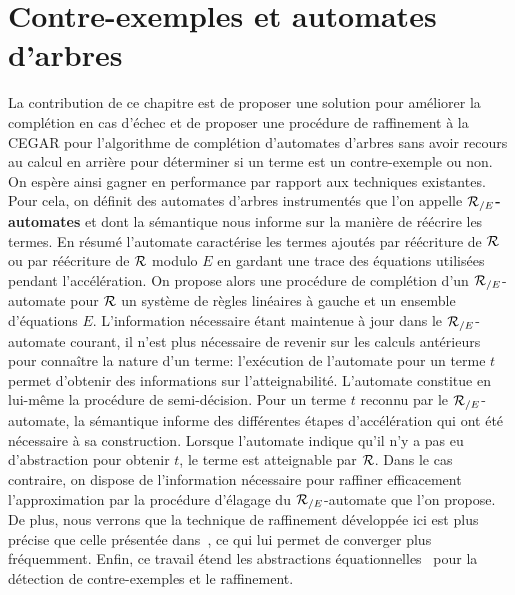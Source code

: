 
\section{Contre-exemples et automates d'arbres}

La contribution de ce chapitre est de proposer une solution pour améliorer
la complétion en cas d'échec et de proposer une procédure de raffinement
à la CEGAR pour l'algorithme de complétion d'automates d'arbres sans avoir recours 
au calcul en arrière pour déterminer si un terme est un contre-exemple ou non.
On espère ainsi gagner en performance par rapport aux techniques existantes.
Pour cela, on définit des automates d'arbres instrumentés que
l'on appelle \textbf{${\mathcal R_{/E}}$-automates} et dont la sémantique 
nous informe sur la manière de réécrire les termes.
En résumé l'automate caractérise les termes ajoutés par réécriture
de $\mathcal R$ ou par réécriture de $\mathcal R$ modulo $E$ en gardant une trace
des équations utilisées pendant l'accélération.
On propose alors une procédure de complétion d'un ${\mathcal R_{/E}}$-automate
pour $\mathcal R$ un système de règles linéaires à gauche et un ensemble d'équations $E$.
L'information nécessaire étant maintenue à jour dans le ${\mathcal R_{/E}}$-automate courant, 
il n'est plus nécessaire de revenir sur les calculs antérieurs pour
connaître la nature d'un terme: l'exécution de l'automate pour un terme $t$
permet d'obtenir des informations sur l'atteignabilité. L'automate constitue en lui-même
la procédure de semi-décision.
Pour un terme $t$ reconnu par le ${\mathcal R_{/E}}$-automate, la sémantique informe des différentes étapes
d'accélération qui ont été nécessaire à sa construction. Lorsque l'automate indique qu'il n'y a
pas eu d'abstraction pour obtenir $t$, le terme est atteignable par $\mathcal R$.  Dans le cas
contraire, on dispose de l'information nécessaire pour raffiner efficacement l'approximation par la procédure 
d'élagage du ${\mathcal R_{/E}}$-automate que l'on propose.
De plus, nous verrons que la technique de raffinement développée ici est plus
précise que celle présentée dans~\cite{BCHK08}, ce qui lui permet de   
converger plus fréquemment. Enfin, ce travail étend les abstractions
équationnelles~\cite{MeseguerPM-TCS08,Takai-RTA04} pour la détection
de contre-exemples et le raffinement.

